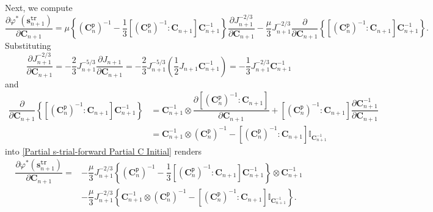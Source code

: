 \documentclass[preprint,11pt]{elsarticle}
\theoremstyle{definition}
\begin{document}
Next, we compute
\begin{equation} \label{Partial s-trial-forward Partial C Initial}
    \dfrac{\partial \varphi^*(\mathbf{s}_{n+1}^\texttt{tr})}{\partial \mathbf{C}_{n+1}}
    = \mu \left\{ \left( \mathbf{C}_n^\texttt{p} \right)^{-1}
    - \dfrac{1}{3} \left[ \left( \mathbf{C}_n^\texttt{p} \right)^{-1} : \mathbf{C}_{n+1} \right] \mathbf{C}_{n+1}^{-1} \right\} \dfrac{\partial J_{n+1}^{-2/3}}{\partial \mathbf{C}_{n+1}}
    - \dfrac{\mu}{3} J_{n+1}^{-2/3} \dfrac{\partial}{\partial \mathbf{C}_{n+1}} \left\{ \left[ \left( \mathbf{C}_n^\texttt{p} \right)^{-1} : \mathbf{C}_{n+1} \right] \mathbf{C}_{n+1}^{-1} \right\}.
\end{equation}
Substituting
\begin{equation} \label{Partial J^(-2/3) Partial C}
    \dfrac{\partial J_{n+1}^{-2/3}}{\partial \mathbf{C}_{n+1}}
    = - \dfrac{2}{3} J_{n+1}^{-5/3} \dfrac{\partial J_{n+1}}{\partial \mathbf{C}_{n+1}}
    = - \dfrac{2}{3} J_{n+1}^{-5/3} \left( \dfrac{1}{2} J_{n+1} \mathbf{C}_{n+1}^{-1} \right)
    = - \dfrac{1}{3} J_{n+1}^{-2/3} \mathbf{C}_{n+1}^{-1}
\end{equation}
and
\begin{equation*}
    \begin{array}{ll}
        \dfrac{\partial}{\partial \mathbf{C}_{n+1}} \left\{ \left[ \left( \mathbf{C}_n^\texttt{p} \right)^{-1} : \mathbf{C}_{n+1} \right] \mathbf{C}_{n+1}^{-1} \right\}
        &= \mathbf{C}_{n+1}^{-1} \otimes \dfrac{\partial \left[ \left( \mathbf{C}_n^\texttt{p} \right)^{-1} : \mathbf{C}_{n+1} \right]}{\partial \mathbf{C}_{n+1}}
        + \left[ \left( \mathbf{C}_n^\texttt{p} \right)^{-1} : \mathbf{C}_{n+1} \right] \dfrac{\partial \mathbf{C}_{n+1}^{-1}}{\partial \mathbf{C}_{n+1}} \\[12pt]
        & = \mathbf{C}_{n+1}^{-1} \otimes \left( \mathbf{C}_n^\texttt{p} \right)^{-1}
        - \left[ \left( \mathbf{C}_n^\texttt{p} \right)^{-1} : \mathbf{C}_{n+1} \right] \mathbb{I}_{\mathbf{C}_{n+1}^{-1}}
    \end{array}
\end{equation*}
into \eqref{Partial s-trial-forward Partial C Initial} renders
\begin{equation*}
    \begin{array}{ll}
        \dfrac{\partial \varphi^*(\mathbf{s}_{n+1}^\texttt{tr})}{\partial \mathbf{C}_{n+1}}
        = &- \dfrac{\mu}{3} J_{n+1}^{-2/3} \left\{ \left( \mathbf{C}_n^\texttt{p} \right)^{-1}
        - \dfrac{1}{3} \left[ \left( \mathbf{C}_n^\texttt{p} \right)^{-1} : \mathbf{C}_{n+1} \right] \mathbf{C}_{n+1}^{-1} \right\} \otimes \mathbf{C}_{n+1}^{-1} \\[12pt]

         & - \dfrac{\mu}{3} J_{n+1}^{-2/3}
        \left\{ \mathbf{C}_{n+1}^{-1} \otimes \left( \mathbf{C}_n^\texttt{p} \right)^{-1}
        - \left[ \left( \mathbf{C}_n^\texttt{p} \right)^{-1} : \mathbf{C}_{n+1} \right] \mathbb{I}_{\mathbf{C}_{n+1}^{-1}} \right\}.
    \end{array}
\end{equation*}
\end{document}
